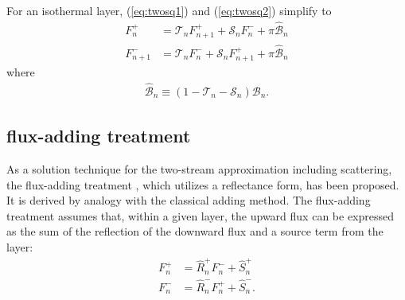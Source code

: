 For an isothermal layer, (\ref{eq:twosq1}) and (\ref{eq:twosq2}) simplify to
\begin{align}
\label{eq:twosq1iso}
 F^+_n &= \mathcal{T}_n F^+_{n+1} + \mathcal{S}_n F^-_n + \pi \hat{\mathcal{B}}_n\\
 \label{eq:twosq2iso}
 F^-_{n+1} &= \mathcal{T}_n F^-_{n} + \mathcal{S}_n F^+_{n+1} + \pi \hat{\mathcal{B}}_n
\end{align}
where
\begin{align}
    \hat{\mathcal{B}}_n \equiv (1 - \mathcal{T}_n - \mathcal{S}_n) \mathcal{B}_n.
\end{align}

\subsection*{flux-adding treatment}\label{ss:flux-adding}

As a solution technique for the two-stream approximation including scattering, the flux-adding treatment \cite{2018JQSRT.211...78R,2023PSJ.....4...10R}, which utilizes a reflectance form, has been proposed. It is derived by analogy with the classical adding method. The flux-adding treatment assumes that, within a given layer, the upward flux can be expressed as the sum of the reflection of the downward flux and a source term from the layer:
\begin{align}
    \label{eq:fa1}
    F_n^+ &= \hat{R}_n^+ F_n^- + \hat{S}_n^+ \\
    \label{eq:fa2}
    F_n^- &= \hat{R}_n^- F_n^+ + \hat{S}_n^-.
\end{align}

